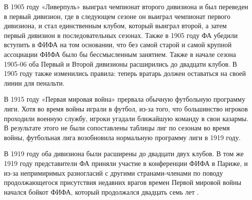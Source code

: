 В 1905 году «Ливерпуль» выиграл чемпионат второго дивизиона и был переведен в первый дивизион, где в следующем сезоне он выиграл чемпионат первого дивизиона, и стал единственным клубом, который выиграл второй, а затем первый дивизион в последовательных сезонах. Также в 1905 году ФА убедили вступить в ФИФА на том основании, что без самой старой и самой крупной ассоциации ФИФА было бы бессмысленным занятием. Также в начале сезона 1905-06 оба Первый и Второй дивизионы расширились до двадцати клубов.  В 1905 году также изменились правила: теперь вратарь должен оставаться на своей линии для пенальти.




В 1915 году «Первая мировая война» прервала обычную футбольную программу лиги. Хотя во время войны играли в футбол, из-за того, что большинство игроков проходили военную службу, игроки угадали ближайшую команду в свои казармы. В результате этого не были сопоставлены таблицы лиг по сезонам во время войны, футбольная лига возобновила нормальную программу лиги в 1919 году.

В 1919 году оба дивизиона были расширены до двадцати двух клубов. В том же 1919 году представители ФА приняли участие в конференции ФИФА в Париже, и из-за непримиримых разногласий с другими странами-членами по поводу продолжающегося присутствия недавних врагов времен Первой мировой войны начался бойкот ФИФА, который продолжался двадцать семь лет .





